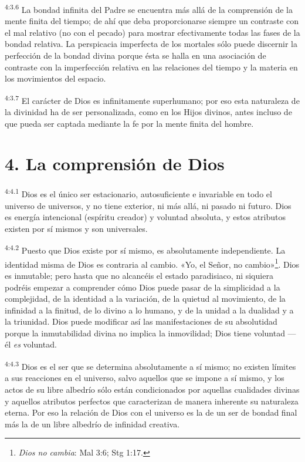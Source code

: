 \par
\textsuperscript{4:3.6} La bondad infinita del Padre se encuentra más allá de la comprensión de la mente finita del tiempo; de ahí que deba proporcionarse siempre un contraste con el mal relativo
(no con el pecado) para mostrar efectivamente todas las fases de la bondad relativa. La perspicacia imperfecta de los mortales sólo puede discernir la perfección de la bondad divina porque ésta se halla en una asociación de contraste con la imperfección relativa en las relaciones del tiempo y la materia en los movimientos del espacio.

\par
\textsuperscript{4:3.7} El carácter de Dios es infinitamente superhumano; por eso esta naturaleza de la divinidad ha de ser personalizada, como en los Hijos divinos, antes incluso de que pueda ser captada mediante la fe por la mente finita del hombre.

\section*{4. La comprensión de Dios}
\par
\textsuperscript{4:4.1} Dios es el único ser estacionario, autosuficiente e invariable en todo el universo de universos, y no tiene exterior, ni más allá, ni pasado ni futuro. Dios es energía intencional (espíritu creador) y voluntad absoluta, y estos atributos existen por sí mismos y son universales.

\par
\textsuperscript{4:4.2} Puesto que Dios existe por sí mismo, es absolutamente independiente. La identidad misma de Dios es contraria al cambio. «Yo, el Señor, no cambio»\footnote{\textit{Dios no cambia}: Mal 3:6; Stg 1:17.}. Dios es inmutable; pero hasta que no alcancéis el estado paradisiaco, ni siquiera podréis empezar a comprender cómo Dios puede pasar de la simplicidad a la complejidad, de la identidad a la variación, de la quietud al movimiento, de la infinidad a la finitud, de lo divino a lo humano, y de la unidad a la dualidad y a la triunidad. Dios puede modificar así las manifestaciones de su absolutidad porque la inmutabilidad divina no implica la inmovilidad; Dios tiene voluntad ---él \textit{es} voluntad.

\par
\textsuperscript{4:4.3} Dios es el ser que se determina absolutamente a sí mismo; no existen límites a sus reacciones en el universo, salvo aquellos que se impone a sí mismo, y los actos de su libre albedrío sólo están condicionados por aquellas cualidades divinas y aquellos atributos perfectos que caracterizan de manera inherente su naturaleza eterna. Por eso la relación de Dios con el universo es la de un ser de bondad final más la de un libre albedrío de infinidad creativa.

